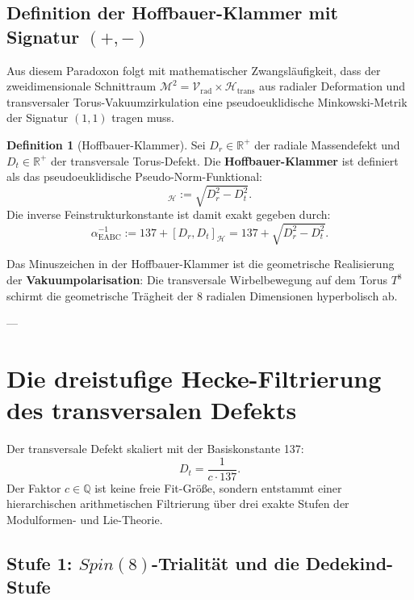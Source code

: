\documentclass[11pt,a4paper]{article}
\theoremstyle{definition}
\newtheorem{definition}[theorem]{Definition}
\theoremstyle{remark}
\numberwithin{equation}{section}
\begin{document}
\subsection{Definition der Hoffbauer-Klammer mit Signatur $(+,-)$}

Aus diesem Paradoxon folgt mit mathematischer Zwangsläufigkeit, dass der zweidimensionale Schnittraum $\mathcal{M}^2 = \mathcal{V}_{\mathrm{rad}} \times \mathcal{H}_{\mathrm{trans}}$ aus radialer Deformation und transversaler Torus-Vakuumzirkulation eine pseudoeuklidische Minkowski-Metrik der Signatur $(1,1)$ tragen muss.

\begin{definition}[Hoffbauer-Klammer]
Sei $D_r \in \mathbb{R}^+$ der radiale Massendefekt und $D_t \in \mathbb{R}^+$ der transversale Torus-Defekt. Die \textbf{Hoffbauer-Klammer} ist definiert als das pseudoeuklidische Pseudo-Norm-Funktional:
\begin{equation}
[D_r, D_t]_{\mathcal{H}} := \sqrt{D_r^2 - D_t^2}.
\end{equation}
Die inverse Feinstrukturkonstante ist damit exakt gegeben durch:
\begin{equation}
\alpha^{-1}_{\mathrm{EABC}} := 137 + [D_r, D_t]_{\mathcal{H}} = 137 + \sqrt{D_r^2 - D_t^2}.
\end{equation}
\end{definition}

Das Minuszeichen in der Hoffbauer-Klammer ist die geometrische Realisierung der \textbf{Vakuumpolarisation}: Die transversale Wirbelbewegung auf dem Torus $T^8$ schirmt die geometrische Trägheit der 8 radialen Dimensionen hyperbolisch ab.

---

\section{Die dreistufige Hecke-Filtrierung des transversalen Defekts}

Der transversale Defekt skaliert mit der Basiskonstante 137:
\begin{equation}
D_t = \frac{1}{c \cdot 137}.
\end{equation}
Der Faktor $c \in \mathbb{Q}$ ist keine freie Fit-Größe, sondern entstammt einer hierarchischen arithmetischen Filtrierung über drei exakte Stufen der Modulformen- und Lie-Theorie.

\subsection{Stufe 1: $Spin(8)$-Trialität und die Dedekind-Stufe}
\end{document}
